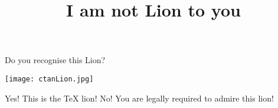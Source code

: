 \documentclass{webquiztex}
\title{I am not Lion to you}
\begin{document}
  \begin{question}
    Do you recognise this Lion?
    \begin{center}
        \texttt{[image: ctanLion.jpg]}
    \end{center}
    \begin{choice}
      \correct Yes!  \feedback This is the \TeX{} lion!
      \incorrect No! \feedback You are legally required to admire this lion!
    \end{choice}
  \end{question}
\end{document}
